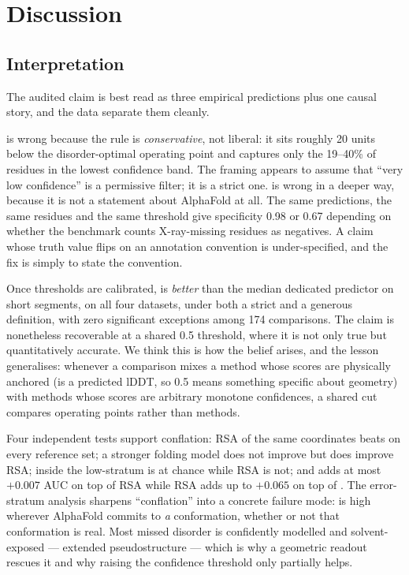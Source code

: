 \section{Discussion}
\label{sec:discussion}

\subsection{Interpretation}

The audited claim is best read as three empirical predictions plus one causal story, and the
data separate them cleanly.

 \cone is wrong
because the rule is \emph{conservative}, not liberal: it sits roughly 20 \plddt units below the
disorder-optimal operating point and captures only the 19--40\% of residues in the lowest
confidence band. The framing appears to assume that ``very low confidence'' is a permissive
filter; it is a strict one. \ctwo is wrong in a deeper way, because it is not a statement about
AlphaFold at all. The same predictions, the same residues and the same threshold give
specificity 0.98 or 0.67 depending on whether the benchmark counts X-ray-missing residues as
negatives. A claim whose truth value flips on an annotation convention is under-specified, and
the fix is simply to state the convention.

 Once thresholds are calibrated, \plddt is \emph{better} than the median dedicated
predictor on short segments, on all four datasets, under both a strict and a generous
definition, with zero significant exceptions among 174 comparisons. The claim is nonetheless
recoverable at a shared 0.5 threshold, where it is not only true but quantitatively accurate.
We think this is how the belief arises, and the lesson generalises: whenever a comparison mixes
a method whose scores are physically anchored (\plddt is a predicted lDDT, so 0.5 means
something specific about geometry) with methods whose scores are arbitrary monotone confidences,
a shared cut compares operating points rather than methods.

 Four independent tests
support conflation: RSA of the same coordinates beats \plddt on every reference set; a stronger
folding model does not improve \plddt but does improve RSA; inside the low-\plddt stratum \plddt
is at chance while RSA is not; and \plddt adds at most $+0.007$ AUC on top of RSA while RSA adds
up to $+0.065$ on top of \plddt. The error-stratum analysis sharpens ``conflation'' into a
concrete failure mode: \plddt is high wherever AlphaFold commits to \emph{a} conformation,
whether or not that conformation is real. Most missed disorder is confidently modelled and
solvent-exposed --- extended pseudostructure --- which is why a geometric readout rescues it and
why raising the confidence threshold only partially helps.

